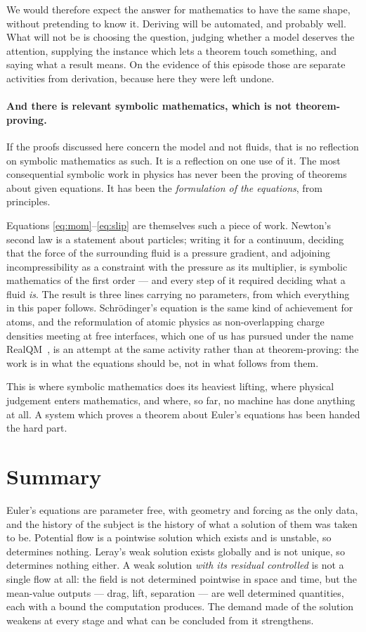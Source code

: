 \documentclass[11pt]{article}
\begin{document}
We would therefore expect the answer for mathematics to have the same shape, without pretending to
know it. Deriving will be automated, and probably well. What will not be is choosing the question,
judging whether a model deserves the attention, supplying the instance which lets a theorem touch
something, and saying what a result means. On the evidence of this episode those are separate
activities from derivation, because here they were left undone.

\paragraph{And there is relevant symbolic mathematics, which is not theorem-proving.} If the proofs
discussed here concern the model and not fluids, that is no reflection on symbolic mathematics as
such. It is a reflection on one use of it. The most consequential symbolic work in physics has never
been the proving of theorems about given equations. It has been the \emph{formulation of the
equations}, from principles.

Equations \eqref{eq:mom}--\eqref{eq:slip} are themselves such a piece of work. Newton's second law is
a statement about particles; writing it for a continuum, deciding that the force of the surrounding
fluid is a pressure gradient, and adjoining incompressibility as a constraint with the pressure as
its multiplier, is symbolic mathematics of the first order --- and every step of it required deciding
what a fluid \emph{is}. The result is three lines carrying no parameters, from which everything in
this paper follows. Schr\"odinger's equation is the same kind of achievement for atoms, and the
reformulation of atomic physics as non-overlapping charge densities meeting at free interfaces, which
one of us has pursued under the name RealQM~\cite{realqm}, is an attempt at the same activity rather
than at theorem-proving: the work is in what the equations should be, not in what follows from them.

This is where symbolic mathematics does its heaviest lifting, where physical judgement enters
mathematics, and where, so far, no machine has done anything at all. A system which proves a theorem
about Euler's equations has been handed the hard part.

\section{Summary}\label{sec:summary}

Euler's equations are parameter free, with geometry and forcing as the only data, and the history of
the subject is the history of what a solution of them was taken to be. Potential flow is a pointwise
solution which exists and is unstable, so determines nothing. Leray's weak solution exists globally
and is not unique, so determines nothing either. A weak solution \emph{with its residual controlled}
is not a single flow at all: the field is not determined pointwise in space and time, but the
mean-value outputs --- drag, lift, separation --- are well determined quantities, each with a bound
the computation produces. The demand made of the solution weakens at every stage
and what can be concluded from it strengthens.
\end{document}
